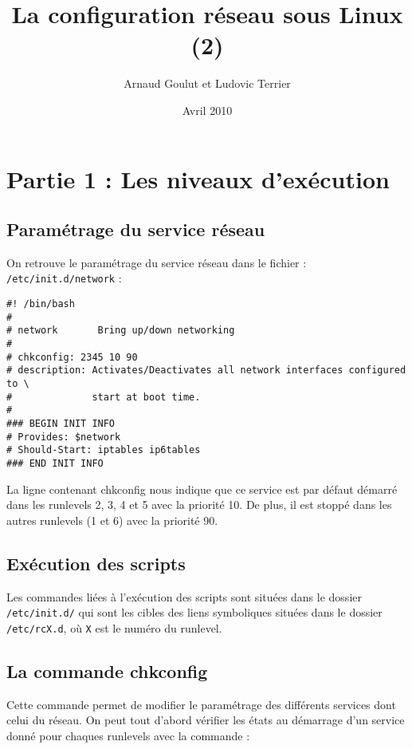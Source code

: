 \documentclass[12pt,a4paper,notitlepage]{article}
\begin{document}
\title{La configuration réseau sous Linux (2)}
\author{Arnaud Goulut et Ludovic Terrier}
\date{Avril 2010}
\maketitle



\thispagestyle{empty}




\section{Partie 1 : Les niveaux d'exécution}

\subsection{Paramétrage du service réseau}
On retrouve le paramétrage du service réseau dans le fichier : \texttt{/etc/init.d/network} :

\begin{lstlisting}
#! /bin/bash
#
# network       Bring up/down networking
#
# chkconfig: 2345 10 90
# description: Activates/Deactivates all network interfaces configured to \
#              start at boot time.
#
### BEGIN INIT INFO
# Provides: $network
# Should-Start: iptables ip6tables
### END INIT INFO
\end{lstlisting}

La ligne contenant chkconfig nous indique que ce service est par défaut démarré dans les runlevels 2, 3, 4 et 5 avec la priorité 10. De plus, il est stoppé dans les autres runlevels (1 et 6) avec la priorité 90. 

\subsection{Exécution des scripts}

Les commandes liées à l'exécution des scripts sont situées dans le dossier \texttt{/etc/init.d/} qui sont les cibles des liens symboliques situées dans le dossier \texttt{/etc/rcX.d}, où \texttt{X} est le numéro du runlevel.


\subsection{La commande chkconfig}
Cette commande permet de modifier le paramétrage des différents services dont celui du réseau. On peut tout d'abord vérifier les états au démarrage d'un service donné pour chaques runlevels avec la commande :
\end{document}
